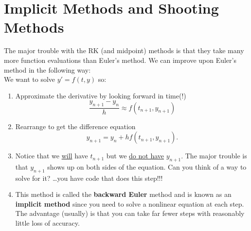 \newpage\section{Implicit Methods and Shooting Methods}
\begin{problem}
    The major trouble with the RK (and midpoint) methods is that they take many more
    function evaluations than Euler's method.  We can improve upon Euler's method in the
    following way:\\
    We want to solve $y' = f(t,y)$ so:
    \begin{enumerate}
        \item Approximate the derivative by looking forward in time(!)
            \[ \frac{y_{n+1} - y_n}{h} \approx f(t_{n+1} , y_{n+1}) \]
        \item Rearrange to get the difference equation
            \[ y_{n+1} = y_n + h f(t_{n+1},y_{n+1}). \]
        \item Notice that we \underline{will} have $t_{n+1}$ but we \underline{do not
            have} $y_{n+1}$.  The major trouble is that $y_{n+1}$ shows up on both sides
            of the equation.  Can you think of a way to solve for it? \dots you have code
            that does this step!!!
        \item This method is called the {\bf backward Euler} method and is known as an
            {\bf implicit method} since you need to solve a nonlinear equation at each
            step.  The advantage (usually) is that you can take far fewer steps with
            reasonably little loss of accuracy.
    \end{enumerate}
\end{problem}


